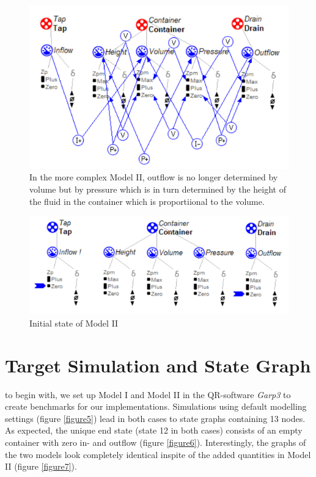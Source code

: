 \documentclass{article}
\begin{document}
\begin{figure}
	\includegraphics{Extra_Flow.png}
	\caption{In the more complex Model II, outflow is no longer determined by volume but by pressure which is in turn determined by the height of the fluid in the container which is proportiional to the volume.}
	\label{figure3}
\end{figure}

\begin{figure}
	\includegraphics{Scenario_2.png}
	\caption{Initial state of Model II}
	\label{figure4}
\end{figure}

\section{Target Simulation and State Graph}

to begin with, we set up Model I and Model II in the QR-software \textit{Garp3} to create benchmarks for our implementations. Simulations using default modelling settings (figure \ref{figure5}) lead in both cases to state graphs containing 13 nodes. As expected, the unique end state (state 12 in both cases) consists of an empty container with zero in- and outflow (figure \ref{figure6}). Interestingly, the graphs of the two models look completely identical inspite of the added quantities in Model II (figure \ref{figure7}).
\end{document}
